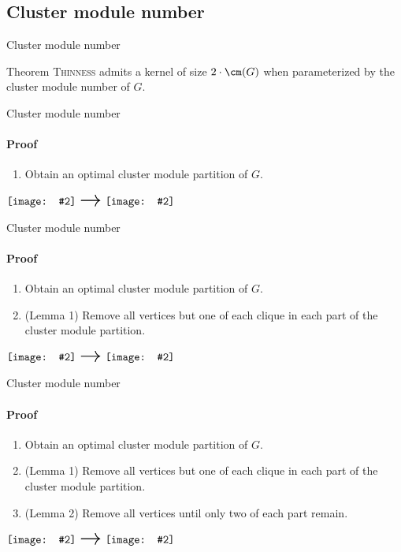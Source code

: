 \documentclass{beamer}
\newcommand{\vimage}[2][]{\vcenter{\hbox{\texttt{[image: \#2]}}}}
\newcommand{\varrow}{\vcenter{\hbox{\scalebox{2}{$\rightarrow$}}}}
\begin{document}
\subsection{Cluster module number}
\begin{frame}{Cluster module number}
    \begin{block}{Theorem}
        \textsc{Thinness} admits a kernel of size $2 \cdot \cm(G)$ when parameterized by the cluster module number of $G$.
    \end{block}
\end{frame}

\begin{frame}{Cluster module number}
    \framesubtitle{Proof}
    \begin{enumerate}
        \item Obtain an optimal cluster module partition of $G$.
    \end{enumerate}

    \begin{center}
    $\vimage[width=0.35\textwidth]{img/graph_with_cluster_module_partition.png}\ \varrow\ \vimage[width=0.4\textwidth]{img/cluster_module_partition.png}$
    \end{center}

\end{frame}

\begin{frame}{Cluster module number}
    \framesubtitle{Proof}
    \begin{enumerate}
        \item Obtain an optimal cluster module partition of $G$.
        \item (Lemma 1) Remove all vertices but one of each clique in each part of the cluster module partition.
    \end{enumerate}

    \begin{center}
        $\vimage[width=0.4\textwidth]{img/cluster_module_partition.png}\ \varrow\ \vimage[width=0.4\textwidth]{img/cluster_module_partition_lemma_1.png}$
    \end{center}
\end{frame}

\begin{frame}{Cluster module number}
    \framesubtitle{Proof}
    \begin{enumerate}
        \item Obtain an optimal cluster module partition of $G$.
        \item (Lemma 1) Remove all vertices but one of each clique in each part of the cluster module partition.
        \item (Lemma 2) Remove all vertices until only two of each part remain.
    \end{enumerate}
    
    \begin{center}
        $\vimage[width=0.4\textwidth]{img/cluster_module_partition_lemma_1.png}\ \varrow\ \vimage[width=0.4\textwidth]{img/cluster_module_partition_lemma_2.png}$
    \end{center}
\end{frame}
\end{document}
